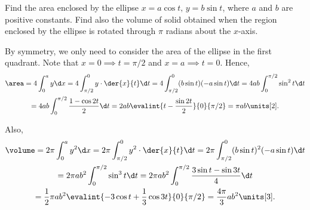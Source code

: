 \begin{problem}
    Find the area enclosed by the ellipse $x = a \cos t, \, y = b \sin t$, where $a$ and $b$ are positive constants. Find also the volume of solid obtained when the region enclosed by the ellipse is rotated through $\pi$ radians about the $x$-axis.
\end{problem}
\begin{solution}
    By symmetry, we only need to consider the area of the ellipse in the first quadrant. Note that $x = 0 \implies t = \pi/2$ and $x = a \implies t = 0$. Hence,
    \begin{gather*}
        \area = 4\int_0^a y \d x = 4\int_{\pi/2}^0 y \cdot \der{x}{t} \d t = 4\int_{\pi/2}^0 (b\sin t)(-a\sin t) \d t = 4ab\int_0^{\pi/2} \sin^2 t \d t\\
        = 4ab\int_0^{\pi/2} \frac{1 - \cos 2t}2 \d t = 2ab \evalint{t - \frac{\sin 2t}2}{0}{\pi/2} = \pi ab \units[2].
    \end{gather*}

    Also,
    \begin{gather*}
        \volume = 2\pi \int_0^a y^2 \d x = 2\pi\int_{\pi/2}^0 y^2 \cdot \der{x}{t} \d t = 2\pi\int_{\pi/2}^0 (b\sin t)^2 (-a\sin t) \d t\\
        = 2\pi a b^2 \int_0^{\pi/2} \sin^3 t \d t = 2\pi a b^2 \int_0^{\pi/2} \frac{3\sin t - \sin 3t}{4} \d t \\
        = \frac12 \pi a b^2 \evalint{-3\cos t + \frac13 \cos 3t}{0}{\pi/2} = \frac{4\pi}3 ab^2 \units[3].
    \end{gather*}
\end{solution}

